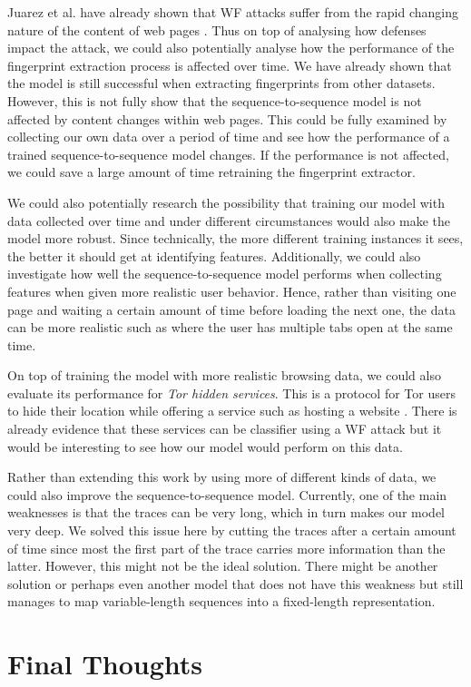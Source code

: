 Juarez et al. have already shown that WF attacks suffer from the rapid changing nature of the content of web pages \cite{wfpevaluation}.
Thus on top of analysing how defenses impact the attack, we could also potentially analyse how the performance of the fingerprint extraction process is affected over time.
We have already shown that the model is still successful when extracting fingerprints from other datasets. %
However, this is not fully show that the sequence-to-sequence model is not affected by content changes within web pages.
This could be fully examined by collecting our own data over a period of time and see how the performance of a trained sequence-to-sequence model changes.
If the performance is not affected, we could save a large amount of time retraining the fingerprint extractor.

We could also potentially research the possibility that training our model with data collected over time and under different circumstances would also make the model more robust.
Since technically, the more different training instances it sees, the better it should get at identifying features.
Additionally, we could also investigate how well the sequence-to-sequence model performs when collecting features when given more realistic user behavior.
Hence, rather than visiting one page and waiting a certain amount of time before loading the next one, the data can be more realistic such as where the user has multiple tabs open at the same time.

On top of training the model with more realistic browsing data, we could also evaluate its performance for \textit{Tor hidden services}.
This is a protocol for Tor users to hide their location while offering a service such as hosting a website \cite{tor_hidden_services}.
There is already evidence that these services can be classifier using a WF attack \cite{kfingerprinting} but it would be interesting to see how our model would perform on this data.

Rather than extending this work by using more of different kinds of data, we could also improve the sequence-to-sequence model.
Currently, one of the main weaknesses is that the traces can be very long, which in turn makes our model very deep.
We solved this issue here by cutting the traces after a certain amount of time since most the first part of the trace carries more information than the latter.
However, this might not be the ideal solution.
There might be another solution or perhaps even another model that does not have this weakness but still manages to map variable-length sequences into a fixed-length representation.


\section{Final Thoughts}

